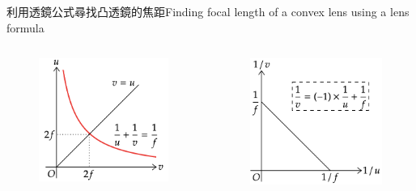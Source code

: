 \documentclass[beamer=true]{standalone}
\begin{document}
\begin{frame}{利用透鏡公式尋找凸透鏡的焦距Finding focal length of a convex lens using a lens formula}
    \begin{columns}
        \begin{figure}
            \centering
            \includegraphics[width=\linewidth]{assets/dun98d89382d32.png}
        \end{figure}
        \begin{figure}
            \centering
            \includegraphics[width=\linewidth]{assets/dqwdqwjddge.png}
        \end{figure}
    \end{columns}
\end{frame}
\end{document}
